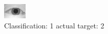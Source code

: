\begin{figure}[h!]
\begin{center}
\includegraphics[width=0.60\columnwidth]{figures/ID977_class_1_target_2.png}
\end{center}
\caption{ Classification: 1 actual target: 2}
\label{fig:ID977_class_1_target_2}
\end{figure}
